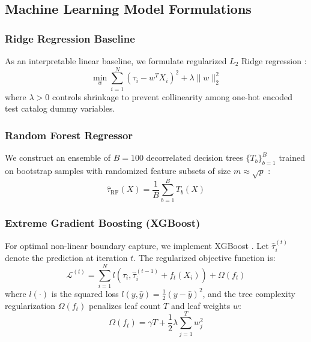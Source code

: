 \documentclass[conference]{IEEEtran}
\begin{document}
\subsection{Machine Learning Model Formulations}

\subsubsection{Ridge Regression Baseline}
As an interpretable linear baseline, we formulate regularized $L_2$ Ridge regression \cite{hoerl1970ridge}:
\begin{equation}
\min_{w} \sum_{i=1}^N \left( \tau_i - w^T X_i \right)^2 + \lambda \|w\|_2^2
\end{equation}
where $\lambda > 0$ controls shrinkage to prevent collinearity among one-hot encoded test catalog dummy variables.

\subsubsection{Random Forest Regressor}
We construct an ensemble of $B = 100$ decorrelated decision trees $\{T_b\}_{b=1}^B$ trained on bootstrap samples with randomized feature subsets of size $m \approx \sqrt{p}$ \cite{breiman2001random}:
\begin{equation}
\hat{\tau}_{\text{RF}}(X) = \frac{1}{B} \sum_{b=1}^B T_b(X)
\end{equation}

\subsubsection{Extreme Gradient Boosting (XGBoost)}
For optimal non-linear boundary capture, we implement XGBoost \cite{chenxgboost2016}. Let $\hat{\tau}_i^{(t)}$ denote the prediction at iteration $t$. The regularized objective function is:
\begin{equation}
\mathcal{L}^{(t)} = \sum_{i=1}^N l\left(\tau_i, \hat{\tau}_i^{(t-1)} + f_t(X_i)\right) + \Omega(f_t)
\end{equation}
where $l(\cdot)$ is the squared loss $l(y, \hat{y}) = \frac{1}{2}(y - \hat{y})^2$, and the tree complexity regularization $\Omega(f_t)$ penalizes leaf count $T$ and leaf weights $w$:
\begin{equation}
\Omega(f_t) = \gamma T + \frac{1}{2} \lambda \sum_{j=1}^T w_j^2
\end{equation}
\end{document}
